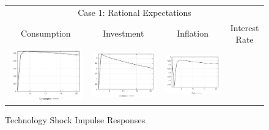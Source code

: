\begin{figure}
\caption{Technology Shock Impulse Responses}\label{fg2:irf_tech}
\vspace*{1pc}\hspace*{-0.28in}
\begin{tabular}{cccc}
\multicolumn{4}{c}{Case 1: Rational Expectations}\\
Consumption & Investment & Inflation & Interest Rate \\ 
\includegraphics[scale=0.22]{results_re/Consumption_techshock_irf.png} & 
\includegraphics[scale=0.22]{results_re/Investment_techshock_irf.png} & 
\includegraphics[scale=0.22]{results_re/Inflation_techshock_irf.png} & 

\end{tabular}
\end{figure}
